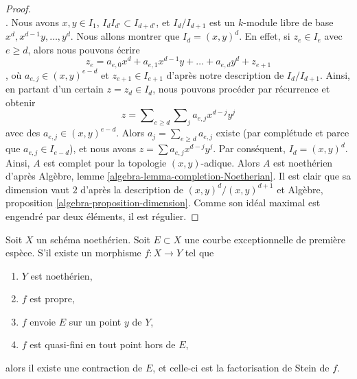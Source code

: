 \begin{proof}
$$$$. Nous avons $x, y \in I_1$, $I_d I_{d'} \subset I_{d + d'}$, et $I_d/I_{d + 1}$ est un $k$-module libre de base $x^d, x^{d - 1}y, \ldots, y^d$. Nous allons montrer que $I_d = (x, y)^d$. En effet, si $z_e \in I_e$ avec $e \geq d$, alors nous pouvons écrire $$
z_e = a_{e, 0} x^d + a_{e, 1} x^{d - 1}y + \ldots + a_{e, d}y^d + z_{e + 1}
$$, où $a_{e, j} \in (x, y)^{e - d}$ et $z_{e + 1} \in I_{e + 1}$ d'après notre description de $I_d/I_{d + 1}$. Ainsi, en partant d'un certain $z = z_d \in I_d$, nous pouvons procéder par récurrence et obtenir $$
z = \sum\nolimits_{e \geq d} \sum\nolimits_j a_{e, j} x^{d - j} y^j
$$ avec des $a_{e, j} \in (x, y)^{e - d}$. Alors $a_j = \sum_{e \geq d} a_{e, j}$ existe (par complétude et parce que $a_{e, j} \in I_{e - d}$), et nous avons $z = \sum a_{e, j} x^{d - j} y^j$. Par conséquent, $I_d = (x, y)^d$. Ainsi, $A$ est complet pour la topologie $(x, y)$-adique. Alors $A$ est noethérien d'après Algèbre, lemme \ref{algebra-lemma-completion-Noetherian}. Il est clair que sa dimension vaut $2$ d'après la description de $(x, y)^d/(x, y)^{d + 1}$ et Algèbre, proposition \ref{algebra-proposition-dimension}. Comme son idéal maximal est engendré par deux éléments, il est régulier. \end{proof}

\begin{lemma} \label{lemma-contraction} Soit $X$ un schéma noethérien. Soit $E \subset X$ une courbe exceptionnelle de première espèce. S'il existe un morphisme $f : X \to Y$ tel que \begin{enumerate} \item $Y$ est noethérien, \item $f$ est propre, \item $f$ envoie $E$ sur un point $y$ de $Y$, \item $f$ est quasi-fini en tout point hors de $E$, \end{enumerate} alors il existe une contraction de $E$, et celle-ci est la factorisation de Stein de $f$. \end{lemma}

